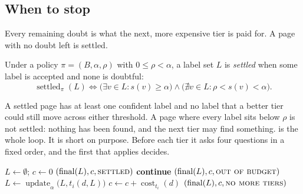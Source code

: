 \subsection{When to stop}\label{sec:cascade-stop}

Every remaining doubt is what the next, more expensive tier is paid for. A page with no doubt left is settled.

\begin{definition}[Settled]\label{def:cascade-settled}
Under a policy $\pi = (B, \alpha, \rho)$ with $0 \le \rho < \alpha$, a label set $L$ is \emph{settled} when some label is accepted and none is doubtful:
\begin{equation}\label{eq:cascade-settled}
  \operatorname{settled}_\pi(L) \iff \bigl(\exists v \in L : s(v) \ge \alpha\bigr) \wedge \bigl(\nexists v \in L : \rho < s(v) < \alpha\bigr).
\end{equation}
\end{definition}

A settled page has at least one confident label and no label that a better tier could still move across either threshold. A page where every label sits below $\rho$ is not settled: nothing has been found, and the next tier may find something.  is the whole loop. It is short on purpose. Before each tier it asks four questions in a fixed order, and the first that applies decides.

\begin{algorithm}[t]
\caption{The cascade for one page and one policy $\pi = (B, \alpha, \rho)$. Tiers come in cost order.}
\label{alg:cascade-run}
\begin{algorithmic}[1]
  \State $L \gets \emptyset$; \quad $c \gets 0$ 
     \Return $(\operatorname{final}(L), c, \textsc{settled})$ \EndIf
     \textbf{continue} \EndIf
     \Return $(\operatorname{final}(L), c, \textsc{out of budget})$ \EndIf
    \State $L \gets \operatorname{update}_\alpha\bigl(L, t_i(d, L)\bigr)$ 
    \State $c \gets c + \operatorname{cost}_{t_i}(d)$
  \EndFor
  \State \Return $(\operatorname{final}(L), c, \textsc{no more tiers})$
\EndFunction
\end{algorithmic}
\end{algorithm}

